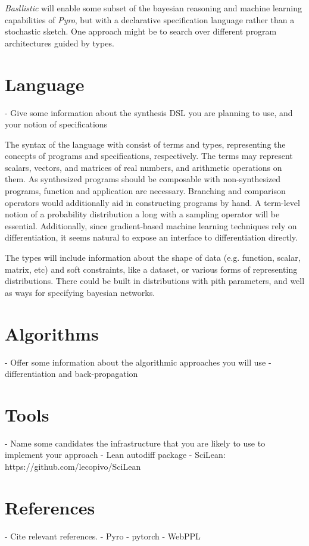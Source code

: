 \documentclass[manuscript]{acmart}
\begin{document}
\emph{Basllistic} will enable some subset of the bayesian reasoning and machine learning capabilities of \emph{Pyro},
but with a declarative specification language rather than a stochastic sketch. 
One approach might be to search over different program architectures guided by types.


\section{Language}
- Give some information about the synthesis DSL you are planning to use, and your notion of specifications

The syntax of the language with consist of terms and types, representing the concepts of programs and specifications, respectively. 
The terms may represent scalars, vectors, and matrices of real numbers, and arithmetic operations on them. 
As synthesized programs should be composable with non-synthesized programs, function and application are necessary.
Branching and comparison operators would additionally aid in constructing programs by hand. 
A term-level notion of a probability distribution a long with a sampling operator will be essential.
Additionally, since gradient-based machine learning techniques rely on differentiation, 
it seems natural to expose an interface to differentiation directly.

The types will include information about the shape of data (e.g. function, scalar, matrix, etc) and soft constraints, like a dataset, or various forms of representing distributions.
There could be built in distributions with pith parameters, and well as ways for specifying bayesian networks. 


\section{Algorithms}
- Offer some information about the algorithmic approaches you will use
- differentiation and back-propagation

\section{Tools}
- Name some candidates the infrastructure that you are likely to use to implement your approach
- Lean autodiff package
- SciLean: https://github.com/lecopivo/SciLean

\section{References}
- Cite relevant references.
- Pyro
- pytorch
- WebPPL
\end{document}
